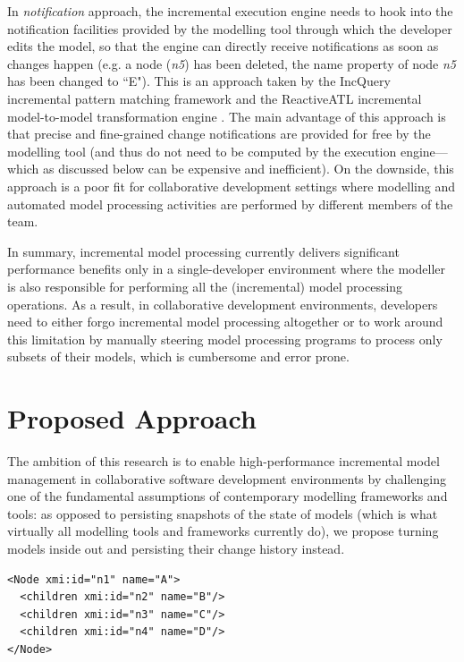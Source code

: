 \documentclass[sigconf]{acmart}
\begin{document}
In \emph{notification} approach, the incremental execution engine needs to hook into the notification facilities provided by the modelling tool through which the developer edits the model, so that the engine can directly receive notifications as soon as changes happen (e.g. a node (\emph{n5}) has been deleted, the name property of node \emph{n5} has been changed to ``E"). This is an approach taken by the IncQuery incremental pattern matching framework \cite{rath2012derived} and the ReactiveATL incremental model-to-model transformation engine \cite{ogunyomi2015property}. The main advantage of this approach is that precise and fine-grained change notifications are provided for free by the modelling tool (and thus do not need to be computed by the execution engine---which as discussed below can be expensive and inefficient). On the downside, this approach is a poor fit for collaborative development settings where modelling and automated model processing activities are performed by different members of the team.

In summary, incremental model processing currently delivers significant performance benefits only in a single-developer environment where the modeller is also responsible for performing all the (incremental) model processing operations. As a result, in collaborative development environments, developers need to either forgo incremental model processing altogether or to work around this limitation by manually steering model processing programs to process only subsets of their models, which is cumbersome and error prone.

\section{Proposed Approach}
\label{sec:proposed_approach}
The ambition of this research is to enable high-performance incremental model management in collaborative software development environments by challenging one of the fundamental assumptions of contemporary modelling frameworks and tools: as opposed to persisting snapshots of the state of models (which is what virtually all modelling tools and frameworks currently do), we propose turning models inside out and persisting their change history instead.

\begin{lstlisting}[style=xmi,caption={State-based representation of the model of Figure \ref{fig:initial_model} after removal of node \emph{n5} in (simplified) XMI.},label=lst:xmimodel]
<Node xmi:id="n1" name="A">
  <children xmi:id="n2" name="B"/>
  <children xmi:id="n3" name="C"/>
  <children xmi:id="n4" name="D"/>
</Node>
\end{lstlisting}
\end{document}
